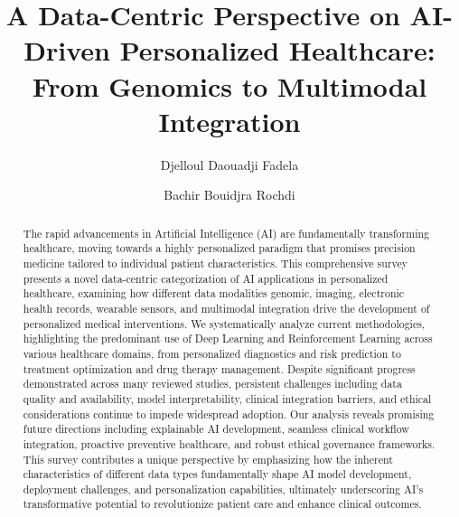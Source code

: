 \documentclass[runningheads]{llncs}
\title{A Data-Centric Perspective on AI-Driven Personalized Healthcare: From Genomics to Multimodal Integration}
\author{Djelloul Daouadji Fadela \and Bachir Bouidjra Rochdi}
\institute{Department of Computer Science, University Mascara, Mascara, Algeria \\
\email{djellouldaouadji.f@univ-mascara.dz}
}
\begin{document}
\maketitle

\begin{abstract}
The rapid advancements in Artificial Intelligence (AI) are fundamentally transforming healthcare, moving towards a highly personalized paradigm that promises precision medicine tailored to individual patient characteristics. This comprehensive survey presents a novel data-centric categorization of AI applications in personalized healthcare, examining how different data modalities genomic, imaging, electronic health records, wearable sensors, and multimodal integration drive the development of personalized medical interventions. We systematically analyze current methodologies, highlighting the predominant use of Deep Learning and Reinforcement Learning across various healthcare domains, from personalized diagnostics and risk prediction to treatment optimization and drug therapy management. Despite significant progress demonstrated across many reviewed studies, persistent challenges including data quality and availability, model interpretability, clinical integration barriers, and ethical considerations continue to impede widespread adoption. Our analysis reveals promising future directions including explainable AI development, seamless clinical workflow integration, proactive preventive healthcare, and robust ethical governance frameworks. This survey contributes a unique perspective by emphasizing how the inherent characteristics of different data types fundamentally shape AI model development, deployment challenges, and personalization capabilities, ultimately underscoring AI's transformative potential to revolutionize patient care and enhance clinical outcomes.
\end{abstract}

\end{document}
